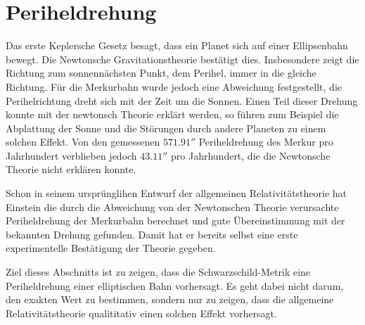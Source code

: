 \section{Periheldrehung}
Das erste Keplersche Gesetz besagt, dass ein Planet sich auf einer
Ellipsenbahn bewegt.
Die Newtonsche Gravitationstheorie bestätigt dies.
Insbesondere zeigt die Richtung zum sonnennächsten Punkt, dem Perihel,
immer in die gleiche Richtung.
Für die Merkurbahn wurde jedoch eine Abweichung festgestellt, die
Perihelrichtung dreht sich mit der Zeit um die Sonnen.
Einen Teil dieser Drehung konnte mit der newtonsch Theorie erklärt werden,
so führen zum Beispiel die Abplattung der Sonne und die Störungen durch
andere Planeten zu einem solchen Effekt.
Von den gemessenen $571.91''$ Periheldrehung des Merkur pro Jahrhundert
verblieben jedoch $43.11''$ pro Jahrhundert, die die Newtonsche
Theorie nicht erklären konnte.

Schon in seinem ursprünglihen Entwurf der allgemeinen Relativitätstheorie
hat Einstein die durch die Abweichung von der Newtonschen Theorie
verursachte Periheldrehung der Merkurbahn berechnet und gute Übereinstimmung
mit der bekannten Drehung gefunden.
Damit hat er bereits selbst eine erste experimentelle Bestätigung
der Theorie gegeben.

Ziel dieses Abschnitts ist zu zeigen, dass die Schwarzschild-Metrik
eine Periheldrehung einer elliptischen Bahn vorhersagt.
Es geht dabei nicht darum, den exakten Wert zu bestimmen,
sondern nur zu zeigen, dass die allgemeine Relativitätstheorie
qualititativ einen solchen Effekt vorhersagt.

